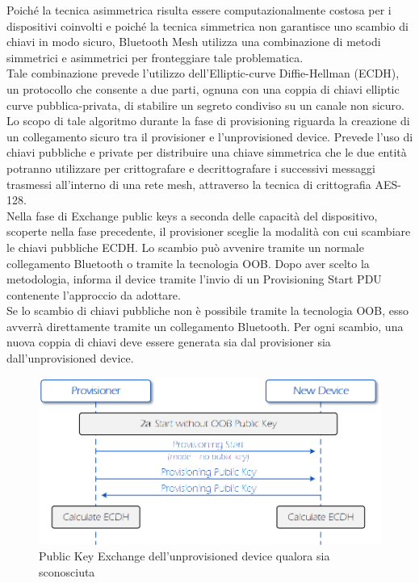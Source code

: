 \noindent Poiché la tecnica asimmetrica risulta essere computazionalmente costosa per i dispositivi coinvolti e poiché la tecnica simmetrica non garantisce uno scambio di chiavi in modo sicuro, Bluetooth Mesh utilizza una combinazione di metodi simmetrici e asimmetrici per fronteggiare tale problematica.\\
Tale combinazione prevede l'utilizzo dell'Elliptic-curve Diffie-Hellman (ECDH), un protocollo che consente a due parti, ognuna con una coppia di chiavi elliptic curve pubblica-privata, di stabilire un segreto condiviso su un canale non sicuro. Lo scopo di tale algoritmo durante la fase di provisioning riguarda la creazione di un collegamento sicuro tra il provisioner e l'unprovisioned device. Prevede l'uso di chiavi pubbliche e private per distribuire una chiave simmetrica che le due entità potranno utilizzare per crittografare e decrittografare i successivi messaggi trasmessi all'interno di una rete mesh, attraverso la tecnica di crittografia AES-128.\\

\noindent Nella fase di Exchange public keys a seconda delle capacità del dispositivo, scoperte nella fase precedente, il provisioner sceglie la modalità con cui scambiare le chiavi pubbliche ECDH. Lo scambio può avvenire tramite un normale collegamento Bluetooth o tramite la tecnologia OOB.
Dopo aver scelto la metodologia, informa il device tramite l'invio di un Provisioning Start PDU contenente l'approccio da adottare.\\

\noindent Se lo scambio di chiavi pubbliche non è possibile tramite la tecnologia OOB, esso avverrà direttamente tramite un collegamento Bluetooth. Per ogni scambio, una nuova coppia di chiavi deve essere generata sia dal provisioner sia dall'unprovisioned device.

\begin{figure}[!ht]
    \centering
    \includegraphics[width = \textwidth]{images/Provisioning_public_key_exchange_a.png}
    \caption{Public Key Exchange dell'unprovisioned device qualora sia sconosciuta}
    \label{fig:provisioning_public_key_a}
\end{figure}

